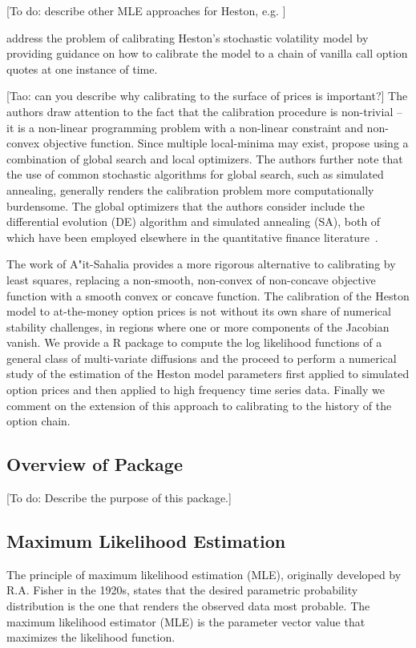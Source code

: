 \documentclass{article}
\begin{document}
[To do: describe other MLE approaches for Heston, e.g. \cite{Mariani2008}]


\cite{MIKHAILOV2003} address the problem of calibrating Heston's stochastic volatility model by providing guidance on how to calibrate the model to a chain of vanilla call option quotes at one instance of time.

[Tao: can you describe why calibrating to the surface of prices is important?]
The authors draw attention to the fact that the calibration procedure is non-trivial -- it is a non-linear programming problem with a non-linear constraint and non-convex objective function. Since multiple local-minima may exist, \cite{MIKHAILOV2003} propose using a combination of global search and local optimizers.  The authors further note that the use of common stochastic algorithms for global search, such as simulated annealing, generally renders the calibration problem more computationally burdensome. The global optimizers that the authors consider include the differential evolution (DE) algorithm and simulated annealing (SA), both of which have been employed elsewhere in the quantitative finance literature~\cite{ARDIA2011}.


The work of A"{i}t-Sahalia provides a more rigorous alternative to calibrating by least squares, replacing a non-smooth, non-convex of non-concave objective function with a smooth convex or concave function. The calibration of the Heston model to at-the-money option prices is not without its own share of numerical stability challenges, in regions where one or more components of the Jacobian vanish. We provide a R package to compute the log likelihood functions of a general class of multi-variate diffusions and the proceed to perform a numerical study of the estimation of the Heston model parameters first applied to simulated option prices and then applied to high frequency time series data. Finally we comment on the extension of this approach to calibrating to the history of the option chain.

\subsection{Overview of Package}

[To do: Describe the purpose of this package.]

\subsection{Maximum Likelihood Estimation}
The  principle  of
maximum   likelihood   estimation
(MLE), originally developed by R.A. Fisher in the
1920s, states that the desired parametric probability distribution is
the one that renders the observed data most probable.  The maximum likelihood estimator (MLE) is the parameter vector value that maximizes the likelihood function.
\end{document}
